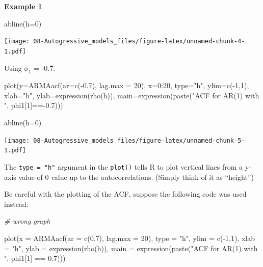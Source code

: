 \documentclass[
]{book}
\newenvironment{Shaded}{\begin{snugshade}}{\end{snugshade}}
\newcommand{\AttributeTok}[1]{\textcolor[rgb]{0.77,0.63,0.00}{#1}}
\newcommand{\CommentTok}[1]{\textcolor[rgb]{0.56,0.35,0.01}{\textit{#1}}}
\newcommand{\DecValTok}[1]{\textcolor[rgb]{0.00,0.00,0.81}{#1}}
\newcommand{\FloatTok}[1]{\textcolor[rgb]{0.00,0.00,0.81}{#1}}
\newcommand{\FunctionTok}[1]{\textcolor[rgb]{0.00,0.00,0.00}{#1}}
\newcommand{\NormalTok}[1]{#1}
\newcommand{\SpecialCharTok}[1]{\textcolor[rgb]{0.00,0.00,0.00}{#1}}
\newcommand{\StringTok}[1]{\textcolor[rgb]{0.31,0.60,0.02}{#1}}
\theoremstyle{definition}
\theoremstyle{definition}
\newtheorem{example}{Example}[chapter]
\theoremstyle{definition}
\theoremstyle{definition}
\theoremstyle{remark}
\begin{document}
\begin{example}
\begin{Shaded}
\begin{Highlighting}[]
\FunctionTok{abline}\NormalTok{(}\AttributeTok{h=}\DecValTok{0}\NormalTok{)}
\end{Highlighting}
\end{Shaded}

\texttt{[image: 08-Autogressive\_models\_files/figure-latex/unnamed-chunk-4-1.pdf]}

Using \(\phi_1\) = -0.7.

\begin{Shaded}
\begin{Highlighting}[]
\FunctionTok{plot}\NormalTok{(}\AttributeTok{y=}\FunctionTok{ARMAacf}\NormalTok{(}\AttributeTok{ar=}\FunctionTok{c}\NormalTok{(}\SpecialCharTok{{-}}\FloatTok{0.7}\NormalTok{), }\AttributeTok{lag.max =} \DecValTok{20}\NormalTok{), }\AttributeTok{x=}\DecValTok{0}\SpecialCharTok{:}\DecValTok{20}\NormalTok{, }\AttributeTok{type=}\StringTok{"h"}\NormalTok{, }\AttributeTok{ylim=}\FunctionTok{c}\NormalTok{(}\SpecialCharTok{{-}}\DecValTok{1}\NormalTok{,}\DecValTok{1}\NormalTok{), }\AttributeTok{xlab=}\StringTok{"h"}\NormalTok{, }\AttributeTok{ylab=}\FunctionTok{expression}\NormalTok{(}\FunctionTok{rho}\NormalTok{(h)), }\AttributeTok{main=}\FunctionTok{expression}\NormalTok{(}\FunctionTok{paste}\NormalTok{(}\StringTok{"ACF for AR(1) with "}\NormalTok{, phi1[}\DecValTok{1}\NormalTok{]}\SpecialCharTok{=={-}}\FloatTok{0.7}\NormalTok{)))}

\FunctionTok{abline}\NormalTok{(}\AttributeTok{h=}\DecValTok{0}\NormalTok{)}
\end{Highlighting}
\end{Shaded}

\texttt{[image: 08-Autogressive\_models\_files/figure-latex/unnamed-chunk-5-1.pdf]}

The \texttt{type\ =\ "h"} argument in the \texttt{plot()} tells R to plot vertical lines from a y-axis value of 0 value up to the autocorrelations. (Simply think of it as ``height'')
\end{example}

Be careful with the plotting of the ACF, suppose the following code was used instead:

\begin{Shaded}
\begin{Highlighting}[]
\CommentTok{\# wrong graph}

\FunctionTok{plot}\NormalTok{(}\AttributeTok{x =} \FunctionTok{ARMAacf}\NormalTok{(}\AttributeTok{ar =} \FunctionTok{c}\NormalTok{(}\FloatTok{0.7}\NormalTok{), }\AttributeTok{lag.max =} \DecValTok{20}\NormalTok{), }\AttributeTok{type =} 
    \StringTok{"h"}\NormalTok{, }\AttributeTok{ylim =} \FunctionTok{c}\NormalTok{(}\SpecialCharTok{{-}}\DecValTok{1}\NormalTok{,}\DecValTok{1}\NormalTok{), }\AttributeTok{xlab =} \StringTok{"h"}\NormalTok{, }\AttributeTok{ylab =} 
    \FunctionTok{expression}\NormalTok{(}\FunctionTok{rho}\NormalTok{(h)), }\AttributeTok{main =} \FunctionTok{expression}\NormalTok{(}\FunctionTok{paste}\NormalTok{(}\StringTok{"ACF }
\StringTok{    for AR(1) with "}\NormalTok{, phi1[}\DecValTok{1}\NormalTok{] }\SpecialCharTok{==} \FloatTok{0.7}\NormalTok{)))}
\end{Highlighting}
\end{Shaded}
\end{document}
